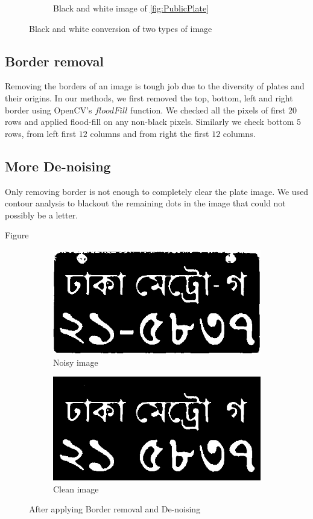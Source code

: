 \documentclass{standalone}
\begin{document}
\begin{figure}
\begin{subfigure}{.5\textwidth}
  \caption{Black and white image of \ref{fig:PublicPlate}}
\end{subfigure}
\caption{Black and white conversion of two types of image}
\label{fig:BlackAndWhite}
\end{figure}

\subsection{Border removal}
Removing the borders of an image is tough job due to the diversity of plates and their origins. In our methods, we first removed the top, bottom, left and right border using OpenCV's $floodFill$ function. We checked all the pixels of first $20$ rows and applied flood-fill on any non-black pixels. Similarly we check bottom $5$ rows, from left first $12$ columns and from right the first $12$ columns.

\subsection{More De-noising}
Only removing border is not enough to completely clear the plate image. We used contour analysis to blackout the remaining dots in the image that could not possibly be a letter. 

Figure 

\begin{figure}
\begin{subfigure}{.5\textwidth}
  \centering
  \includegraphics[width=.8\linewidth]{./img/sample/stage11.jpg}
  \caption{Noisy image}
\end{subfigure}
\begin{subfigure}{.5\textwidth}
  \centering
  \includegraphics[width=.8\linewidth]{./img/sample/stage12.jpg}
  \caption{Clean image}
\end{subfigure}
\caption{After applying Border removal and De-noising}
\label{fig:CleaningStage}
\end{figure}
\end{document}
